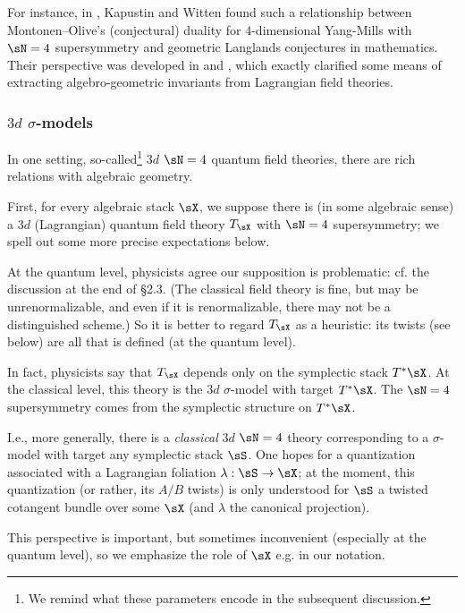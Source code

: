 For instance, in \cite{kapustin-witten},
Kapustin and Witten found such a relationship
between Montonen--Olive's (conjectural) duality for
$4$-dimensional Yang-Mills with $\sN = 4$ supersymmetry and geometric Langlands
conjectures in mathematics. Their perspective was developed in
\cite{costello-ss-2-4} and
\cite{elliott-yoo}, which exactly clarified some means of extracting
algebro-geometric invariants from Lagrangian field theories.

\subsubsection{$3d$ $\sigma$-models}

In one setting, so-called\footnote{We remind what these parameters
encode in the subsequent discussion.}
$3d$ $\sN = 4$ quantum field theories, there are
rich relations with algebraic geometry.

First, for every algebraic stack $\sX$, we suppose
there is (in some algebraic sense)
a $3d$ (Lagrangian) quantum field theory
$T_{\sX}$ with $\sN = 4$ supersymmetry;
we spell out some more precise expectations below.

\begin{rem}
\notready\label{r:no-qft}

At the quantum level, physicists agree our supposition is problematic:
cf. the discussion at the
end of \cite{rozansky-witten} \S 2.3. (The
classical field theory is fine, but may be unrenormalizable, and even if it is
renormalizable, there may not be a distinguished scheme.)
So it is better
to regard $T_{\sX}$ as a heuristic:
its twists (see below) are all that is defined
(at the quantum level).

\end{rem}

\begin{rem}
\notready\label{r:3d-t*}

In fact, physicists
say that $T_{\sX}$ depends only on the symplectic stack
$T^* \sX$. At the classical level, this theory
is the $3d$ $\sigma$-model with target $T^*\sX$.
The $\sN = 4$ supersymmetry comes from the
symplectic structure on $T^*\sX$.

I.e., more generally, there is a \emph{classical} $3d$ $\sN = 4$ theory
corresponding to a $\sigma$-model with target any symplectic stack $\sS$.
One hopes for a quantization associated with a Lagrangian
foliation $\lambda:\sS \to \sX$;
at the moment, this quantization (or rather, its $A/B$ twists)
is only understood for $\sS$ a twisted cotangent bundle over some $\sX$
(and $\lambda$ the canonical projection).

This perspective is important, but sometimes
inconvenient (especially at the quantum level),
so we emphasize the role of $\sX$ e.g. in our notation.

\end{rem}

